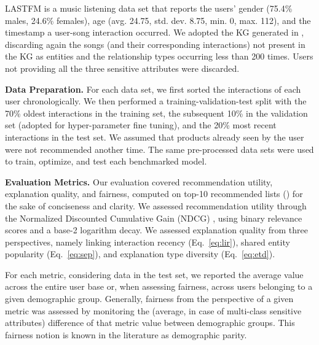 \documentclass[sigconf]{acmart}
\begin{document}
LASTFM is a music listening data set that reports the users' gender (75.4\% males, 24.6\% females), age (avg. 24.75, std. dev. 8.75, min. 0, max. 112), and the timestamp a user-song interaction occurred. 
We adopted the KG generated in \cite{Wang00LC19}, discarding again the songs (and their corresponding interactions) not present in the KG as entities and the relationship types occurring less than 200 times. 
Users not providing all the three sensitive attributes were discarded.  

\vspace{1mm}\noindent\textbf{Data Preparation.} 
For each data set, we first sorted the interactions of each user chronologically. 
We then performed a training-validation-test split with the 70\% oldest interactions in the training set, the subsequent 10\% in the validation set (adopted for hyper-parameter fine tuning), and the 20\% most recent interactions in the test set. 
We assumed that products already seen by the user were not recommended another time. 
The same pre-processed data sets were used to train, optimize, and test each benchmarked model.

\vspace{1mm}\noindent\textbf{Evaluation Metrics.} 
Our evaluation covered recommendation utility, explanation quality, and fairness, computed on top-10 recommended lists () for the sake of conciseness and clarity. 
We assessed recommendation utility through the Normalized Discounted Cumulative Gain (NDCG) \cite{WangWLHL13}, using binary relevance scores and a base-2 logarithm decay.
We assessed explanation quality from three perspectives, namely linking interaction recency (Eq.~\eqref{eq:lir}), shared entity popularity (Eq.~\eqref{eq:sep}), and explanation type diversity (Eq.~\eqref{eq:etd}). 

For each metric, considering data in the test set, we reported the average value across the entire user base or, when assessing fairness, across users belonging to a given demographic group.
Generally, fairness from the perspective of a given metric was assessed by monitoring the (average, in case of multi-class sensitive attributes) difference of that metric value between demographic groups.
This fairness notion is known in the literature as demographic parity.
\end{document}
